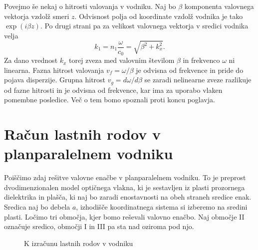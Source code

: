 Povejmo še nekaj o hitrosti valovanja v vodniku.
Naj bo $\beta$ komponenta valovnega vektorja vzdolž smeri $z$. Odvisnost polja
od koordinate vzdolž vodnika je tako $\exp (i\beta z)$. Po drugi strani pa za velikost
valovnega vektorja v sredici vodnika velja
\begin{equation}
k_1 = n_{1}\frac{\omega}{c_0}=\sqrt{\beta^{2}+k_{x}^{2}}
\label{9.0}.
\end{equation}
Za dano vrednost $k_{x}$ torej zveza med valovnim številom $\beta$
in frekvenco $\omega$ ni linearna. Fazna hitrost 
valovanja $v_{f}=\omega/\beta$ je
odvisna od frekvence in pride do pojava disperzije. Grupna 
hitrost $v_{g}=d\omega/d\beta$ 
se zaradi nelinearne zveze razlikuje od fazne hitrosti in je odvisna od 
frekvence, kar ima za uporabo vlaken pomembne posledice. Več o tem bomo spoznali 
proti koncu poglavja. 

\section{Račun lastnih rodov v planparalelnem vodniku}
Poiščimo zdaj rešitve valovne enačbe v planparalelnem vodniku. 
To je preprost dvodimenzionalen model optičnega vlakna, ki je sestavljen iz 
plasti prozornega dielektrika in plašča, ki naj bo zaradi enostavnosti na obeh 
straneh sredice enak. Sredica naj bo debela $a$, izhodišče koordinatnega sistema
si izberemo na sredini plasti. Ločimo tri območja, kjer bomo reševali valovno enačbo.
Naj območje II označuje sredico, območji I in III pa sta nad oziroma pod njo. 

\begin{figure}[h]
\centering
\def\svgwidth{120truemm} 

\caption{K izračunu lastnih rodov v vodniku}
\label{fig:vodnikracun}
\end{figure}


